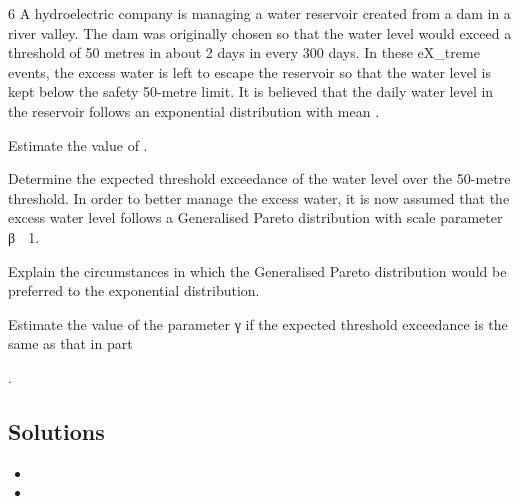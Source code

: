 6 A hydroelectric company is managing a water reservoir created from a dam in a river
valley. The dam was originally chosen so that the water level would exceed a
threshold of 50 metres in about 2 days in every 300 days. In these eX_{t}reme events, the
excess water is left to escape the reservoir so that the water level is kept below the
safety 50-metre limit.
It is believed that the daily water level in the reservoir follows an exponential
distribution with mean \mu.
\item   Estimate the value of \mu. 
\item   Determine the expected threshold exceedance of the water level over the
50-metre threshold. 
In order to better manage the excess water, it is now assumed that the excess water
level follows a Generalised Pareto distribution with scale parameter β 􀵌 1.
\item  Explain the circumstances in which the Generalised Pareto distribution would
be preferred to the exponential distribution. 
\item  Estimate the value of the parameter γ if the expected threshold exceedance is
the same as that in part \item  . 

\subsection*{Solutions}

\begin{itemize}
\item
\item
\end{itemize}



